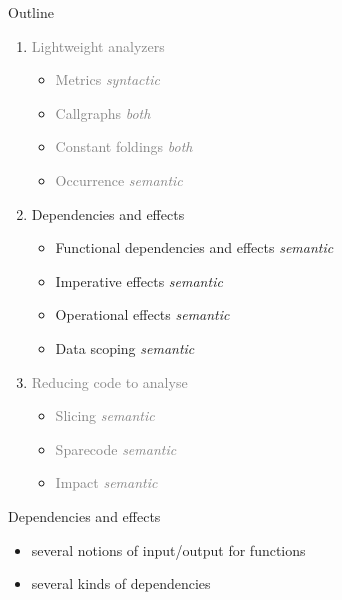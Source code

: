 \documentclass{beamer}
\newcommand{\orange}[1]{{\textcolor{frama-c-1}{#1}}}
\newcommand{\vvert}[1]{{\textcolor{vert}{#1}}}
\newcommand{\gris}[1]{{\textcolor{gray}{#1}}}
\newenvironment{sect}[1]{\orange{#1}\begin{itemize}}{\end{itemize}}
\newenvironment{features}{\begin{sect}{Features}}{\end{sect}}
\begin{document}
\begin{frame}{Outline}
\begin{enumerate}
\item \gris{Lightweight analyzers}
  \begin{itemize}
  \item \gris{Metrics           \hfill \emph{syntactic}}
  \item \gris{Callgraphs        \hfill \emph{both}}
  \item \gris{Constant foldings \hfill \emph{both}}
  \item \gris{Occurrence        \hfill \emph{semantic}}
  \end{itemize}\medskip
%
\item \vvert{Dependencies and effects}
  \begin{itemize}
  \item Functional dependencies and effects  \hfill \emph{semantic}
  \item Imperative effects       \hfill \emph{semantic}
  \item Operational effects      \hfill \emph{semantic}
  \item Data scoping             \hfill \emph{semantic}
  \end{itemize}\medskip
%
\item \gris{Reducing code to analyse}
  \begin{itemize}
  \item \gris{Slicing   \hfill \emph{semantic}}
  \item \gris{Sparecode \hfill \emph{semantic}}
  \item \gris{Impact    \hfill \emph{semantic}}
  \end{itemize}
\end{enumerate}
\end{frame}


\begin{frame}{Dependencies and effects}

\begin{features}
\item several notions of input/output for functions
\item several kinds of dependencies
\end{features}

\end{frame}

\end{document}

